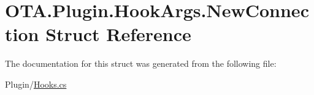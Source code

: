 \hypertarget{struct_o_t_a_1_1_plugin_1_1_hook_args_1_1_new_connection}{}\section{O\+T\+A.\+Plugin.\+Hook\+Args.\+New\+Connection Struct Reference}
\label{struct_o_t_a_1_1_plugin_1_1_hook_args_1_1_new_connection}


The documentation for this struct was generated from the following file\+:\begin{DoxyCompactItemize}
\item 
Plugin/\hyperlink{_hooks_8cs}{Hooks.\+cs}\end{DoxyCompactItemize}
